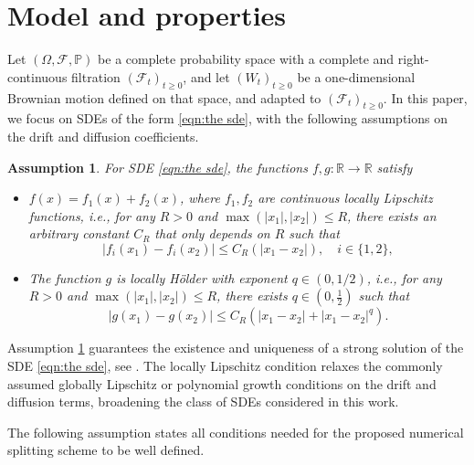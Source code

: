 \documentclass[a4paper,12pt]{article}
\numberwithin{equation}{section}
\theoremstyle{plain}
\newtheorem{assumption}{Assumption}
\theoremstyle{definition}
\begin{document}
\section{Model and properties}\label{sec:set up}
Let $\left(\Omega, \mathcal{F}, \mathbb{P}\right)$ be a complete probability space with a complete and right-continuous filtration $\left(\mathcal{F}_t\right)_{t \geq 0}$, and let $(W_t)_{t\geq 0}$ be a one-dimensional Brownian motion defined on that space, and adapted to $\left(\mathcal{F}_t\right)_{t \geq 0}$. In this paper, we focus on SDEs of the form \eqref{eqn:the sde}, with the following assumptions on the drift and diffusion coefficients. 
\begin{assumption}\label{assump:main}
    For SDE \eqref{eqn:the sde}, the functions $f,g:\mathbb{R}\to \mathbb{R}$ satisfy  
    \begin{itemize}
        \item[(i)] $f(x)=f_1(x)+f_2(x)$, where $f_1,f_2$ are continuous locally Lipschitz functions, i.e.,
        for any $R>0$ and $\max(|x_1|,|x_2|)\leq R$, there exists an arbitrary constant $C_R$ that only depends on $R$ such that
        \begin{equation}
            \left|f_i(x_1)-f_i(x_2)\right|\leq C_R\left(|x_1-x_2|\right), \quad i\in \{1,2\},\label{eqn:f condition}
        \end{equation}
        \item[(ii)] The function $g$ is locally H\"older with exponent $q\in(0,1/2)$, i.e., for any $R>0$ and $\max(|x_1|,|x_2|)\leq R$, there exists $q\in (0,\frac{1}{2})$ such that
        \begin{equation}
            \left|g(x_1)-g(x_2)\right|\leq C_R \left(|x_1-x_2|+|x_1-x_2|^q\right)\label{eqn:g condition}.
        \end{equation}
    \end{itemize}
    
    \end{assumption}
 Assumption \ref{assump:main} guarantees the existence and uniqueness of a strong solution of the SDE \eqref{eqn:the sde}, see \cite{khasminskii_stochastic_2012,mao_stochastic_2011}. The locally Lipschitz condition relaxes the commonly assumed globally Lipschitz or polynomial growth conditions on the drift and diffusion terms, broadening the class of SDEs considered in this work. 

    The following assumption states all conditions needed for the proposed numerical splitting scheme to be well defined.
\end{document}
